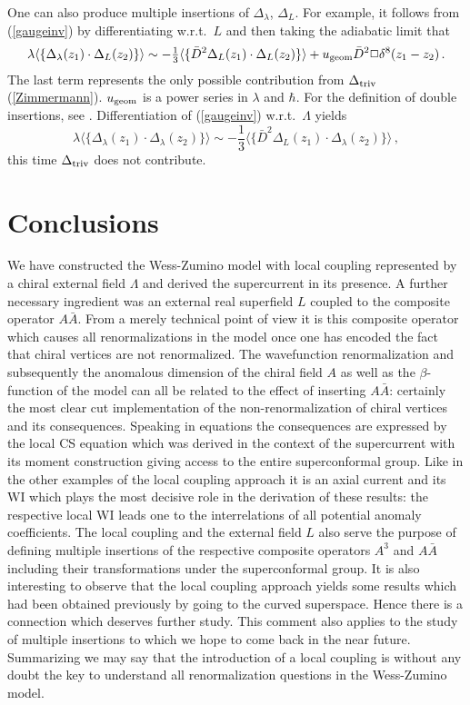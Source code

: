 \documentclass[a4paper,12pt]{article}
\def\l{\langle}
\def\r{\rangle}
\newcommand{\tfr}[2]{{\textstyle \frac{#1}{#2}}}
\begin{document}
One can also produce multiple insertions of $\Delta_\lambda$,
$\Delta_L$. For example, it follows from (\ref{gaugeinv}) by differentiating
w.r.t.\ $L$ and then taking the adiabatic limit that
\begin{equation}
\lambda  \l \{ \Delta_\lambda(z_1) \cdot \Delta_L(z_2)\}\r \sim
-\tfr{1}{3}  \l \{
\bar D^2 \Delta_L(z_1) \cdot \Delta_L(z_2)\}\r + u_{\rm geom} \bar
D^2 \Box \delta^8(z_1-z_2)\,.
\end{equation}
The last term represents the only possible contribution from $\Delta_{\rm
  triv}$ (\ref{Zimmermann}). $u_{\rm geom}$ is a power series in $\lambda$ and
$\hbar$. For the definition of double insertions, see \cite{ER}.
Differentiation of (\ref{gaugeinv}) w.r.t.\ $\Lambda$ yields
\begin{equation}
\lambda \l \{ \Delta_\lambda(z_1)\cdot \Delta_\lambda(z_2)\} \r \sim
-\tfr{1}{3} \l \{ \bar D^2 \Delta_L(z_1)\cdot \Delta_\lambda(z_2)\}\r\,,
\end{equation}
this time $\Delta_{\rm triv}$ does not contribute.

\section{Conclusions}
\setcounter{equation}{0}
We have constructed the Wess-Zumino model with local coupling represented
by a chiral external field ${\Lambda}$ and derived
the supercurrent in its presence. A further necessary ingredient was an external
real superfield $L$ coupled to the composite operator $A\bar{A}$. From a
merely technical point of view it is this composite operator which causes
all renormalizations in the model once one has encoded the fact that
chiral vertices are not renormalized. The wavefunction renormalization
and subsequently the anomalous dimension of the chiral field $A$ as well as
the $\beta$-function of the model can all be related to the effect of inserting
$A\bar A$: certainly the most clear cut implementation of the
non-renormalization of chiral vertices and its consequences. Speaking in
equations the consequences are expressed by the local CS equation which
was derived in the context
of the supercurrent with its moment construction giving access to the
entire superconformal group. Like in the other examples of the local
coupling approach it is an axial current  and its WI which plays the most
decisive role in the derivation of these results: the respective local
WI leads one to the interrelations of all potential anomaly coefficients.
The local coupling and the external field $L$ also serve the purpose
of defining multiple insertions of the respective composite operators
$A^3$ and $A\bar A$ including their transformations under the superconformal
group. It is also interesting to observe that the local coupling approach
yields some results which had been obtained previously by going to the curved
superspace. Hence there is a connection which deserves further study.
This comment also applies to the study of multiple insertions to which we hope to
come back in the near future. Summarizing we may say that the introduction
of a local coupling is without any doubt the key to understand all
renormalization questions in the Wess-Zumino model.
\end{document}
